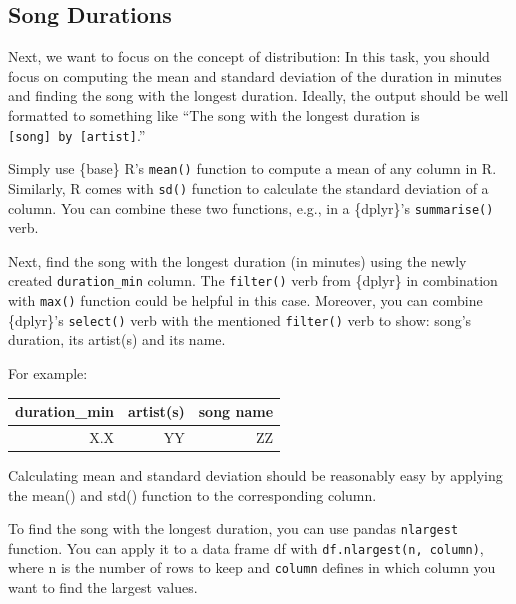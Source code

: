 \documentclass[
  11pt,
]{book}
\newenvironment{tips}[1]
  {
  \begin{itemize}
  \footnotesize
  \renewcommand{\labelitemi}{
    \raisebox{-.7\height}[0pt][0pt]{
      {\setkeys{Gin}{width=3em,keepaspectratio}
        \texttt{[image: images/\#1.png]}}
    }
  }
  \setlength{\fboxsep}{1em}
  \begin{rbox}
  \item
  }
  {
  \end{rbox}
  \end{itemize}
  }
\newenvironment{tipsp}[1]
  {
  \begin{itemize}
  \footnotesize
  \renewcommand{\labelitemi}{
    \raisebox{-.7\height}[0pt][0pt]{
      {\setkeys{Gin}{width=3em,keepaspectratio}
        \texttt{[image: images/\#1.png]}}
    }
  }
  \setlength{\fboxsep}{1em}
  \begin{pbox}
  \item
  }
  {
  \end{pbox}
  \end{itemize}
  }
\begin{document}
\hypertarget{song-durations}{%
\subsection{Song Durations}\label{song-durations}}

Next, we want to focus on the concept of distribution:
In this task, you should focus on computing the mean and standard deviation of the duration in minutes and finding the song with the longest duration.
Ideally, the output should be well formatted to something like ``The song with the longest duration is \texttt{{[}song{]}\ by\ {[}artist{]}}.''

\begin{tips}r

Simply use \{base\} R's \texttt{mean()} function to compute a mean of any column in R. Similarly, R comes with \texttt{sd()} function to calculate the standard deviation of a column. You can combine these two functions, e.g., in a \{dplyr\}'s \texttt{summarise()} verb.

Next, find the song with the longest duration (in minutes) using the newly created \texttt{duration\_min} column. The \texttt{filter()} verb from \{dplyr\} in combination with \texttt{max()} function could be helpful in this case. Moreover, you can combine \{dplyr\}'s \texttt{select()} verb with the mentioned \texttt{filter()} verb to show: song's duration, its artist(s) and its name.

For example:

\begin{longtable}[]{@{}rrr@{}}
\toprule
duration\_min & artist(s) & song name \\
\midrule
\endhead
X.X & YY & ZZ \\
\bottomrule
\end{longtable}

\end{tips}

\begin{tipsp}p

Calculating mean and standard deviation should be reasonably easy by applying the mean() and std() function to the corresponding column.

To find the song with the longest duration, you can use pandas \texttt{nlargest} function. You can apply it to a data frame df with \texttt{df.nlargest(n,\ column)}, where n is the number of rows to keep and \texttt{column} defines in which column you want to find the largest values.

\end{tipsp}
\end{document}
